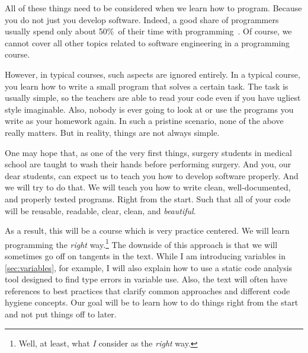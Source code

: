 All of these things need to be considered when we learn how to program.
Because you do not just  you develop software.
Indeed, a good share of programmers usually spend only about 50\%~of their time with programming~\cite{T2019MOSWBFDHOT2TMOSS,AS2019DS2OSRP}.
Of course, we cannot cover all other topics related to software engineering in a programming course.

However, in typical courses, such aspects are ignored entirely.
In a typical course, you learn how to write a small program that solves a certain task.
The task is usually simple, so the teachers are able to read your code even if you have ugliest style imaginable.
Also, nobody is ever going to look at or use the programs you write as your homework again.
In such a pristine scenario, none of the above really matters.
But in reality, things are not always simple.

One may hope that, as one of the very first things, surgery students in medical school are taught to wash their hands before performing surgery.
And you, our dear students, can expect us to teach you how to develop software properly.
And we will try to do that.
We will teach you how to write clean, well-documented, and properly tested programs.
Right from the start.
Such that all of your code will be reusable, readable, clear, clean, and \emph{beautiful}.

As a result, this will be a course which is very practice centered.
We will learn programming the \emph{right} way.\footnote{%
Well, at least, what \emph{I} consider as the \emph{right} way.%
}
The downside of this approach is that we will sometimes go off on tangents in the text.
While I am introducing variables in \cref{sec:variables}, for example, I will also explain how to use a static code analysis tool designed to find type errors in variable use.
Also, the text will often have references to best practices that clarify common approaches and different code hygiene concepts.
Our goal will be to learn how to do things right from the start and not put things off to later.%
%
\endhsection%
%
